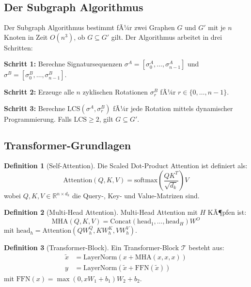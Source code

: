 ﻿\documentclass[a4paper,12pt]{article}
\theoremstyle{definition}
\newtheorem{definition}{Definition}
\begin{document}
\subsection{Der Subgraph Algorithmus}

Der Subgraph Algorithmus \cite{epp2026subgraph} bestimmt fÃ¼r zwei Graphen $G$
und $G'$ mit je $n$ Knoten in Zeit $O(n^3)$, ob $G \subseteq G'$ gilt.
Der Algorithmus arbeitet in drei Schritten:

\textbf{Schritt 1:} Berechne Signatursequenzen $\sigma^A = [\sigma_0^A, \ldots, \sigma_{n-1}^A]$
und $\sigma^B = [\sigma_0^B, \ldots, \sigma_{n-1}^B]$.

\textbf{Schritt 2:} Erzeuge alle $n$ zyklischen Rotationen $\sigma^B_r$
fÃ¼r $r \in \{0, \ldots, n-1\}$.

\textbf{Schritt 3:} Berechne $\mathrm{LCS}(\sigma^A, \sigma^B_r)$ fÃ¼r
jede Rotation mittels dynamischer Programmierung. Falls $\mathrm{LCS} \geq 2$,
gilt $G \subseteq G'$.

\subsection{Transformer-Grundlagen}

\begin{definition}[Self-Attention]
	Die Scaled Dot-Product Attention ist definiert als:
	\[
	\mathrm{Attention}(Q, K, V) = \mathrm{softmax}\!\left(\frac{QK^T}{\sqrt{d_k}}\right) V
	\]
	wobei $Q, K, V \in \mathbb{R}^{n \times d_k}$ die Query-, Key- und Value-Matrizen sind.
\end{definition}

\begin{definition}[Multi-Head Attention]
	Multi-Head Attention mit $H$ KÃ¶pfen ist:
	\[
	\mathrm{MHA}(Q, K, V) = \mathrm{Concat}(\mathrm{head}_1, \ldots, \mathrm{head}_H) W^O
	\]
	mit $\mathrm{head}_h = \mathrm{Attention}(QW_h^Q, KW_h^K, VW_h^V)$.
\end{definition}

\begin{definition}[Transformer-Block]
	Ein Transformer-Block $\mathcal{T}$ besteht aus:
	\begin{align}
	\tilde{x} &= \mathrm{LayerNorm}(x + \mathrm{MHA}(x, x, x)) \\
	y &= \mathrm{LayerNorm}(\tilde{x} + \mathrm{FFN}(\tilde{x}))
	\end{align}
	mit $\mathrm{FFN}(x) = \max(0, xW_1 + b_1)W_2 + b_2$.
\end{definition}
\end{document}
